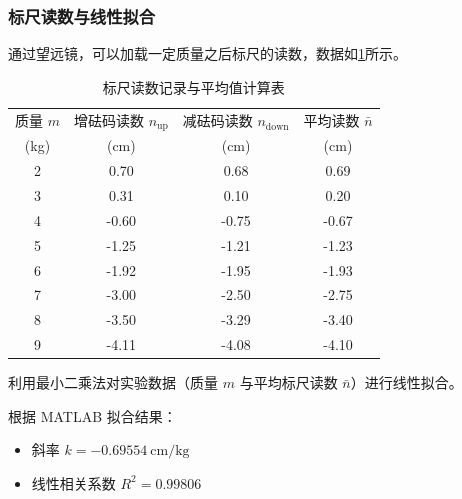 \documentclass{../../templates/Report}%
\begin{document}
\begin{fullreportonly}
    \subsubsection{标尺读数与线性拟合}
    通过望远镜，可以加载一定质量之后标尺的读数，数据如\cref{tab:avg}所示。
    \begin{table}[H]
        \centering
        \caption{标尺读数记录与平均值计算表}
        \label{tab:avg}
        \begin{tabular}{cccc}
            \toprule
            {质量 $m$}            & {增砝码读数 $n_{\text{up}}$} & {减砝码读数 $n_{\text{down}}$} & {平均读数 $\bar{n}$}      \\
            {(\si{\kilo\gram})} & {(\si{\centi\meter})}   & {(\si{\centi\meter})}     & {(\si{\centi\meter})} \\
            \midrule
            2                   & 0.70                    & 0.68                      & 0.69                  \\
            3                   & 0.31                    & 0.10                      & 0.20                  \\
            4                   & -0.60                   & -0.75                     & -0.67                 \\
            5                   & -1.25                   & -1.21                     & -1.23                 \\
            6                   & -1.92                   & -1.95                     & -1.93                 \\
            7                   & -3.00                   & -2.50                     & -2.75                 \\
            8                   & -3.50                   & -3.29                     & -3.40                 \\
            9                   & -4.11                   & -4.08                     & -4.10                 \\
            \bottomrule
        \end{tabular}
    \end{table}

    利用最小二乘法对实验数据（质量 $m$ 与平均标尺读数 $\bar{n}$）进行线性拟合。

    根据 MATLAB 拟合结果：
    \begin{itemize}
        \item 斜率 $k = \SI{-0.69554}{\centi\meter\per\kilo\gram}$
        \item 线性相关系数 $R^2 = 0.99806$
    \end{itemize}


\end{fullreportonly}
\end{document}
